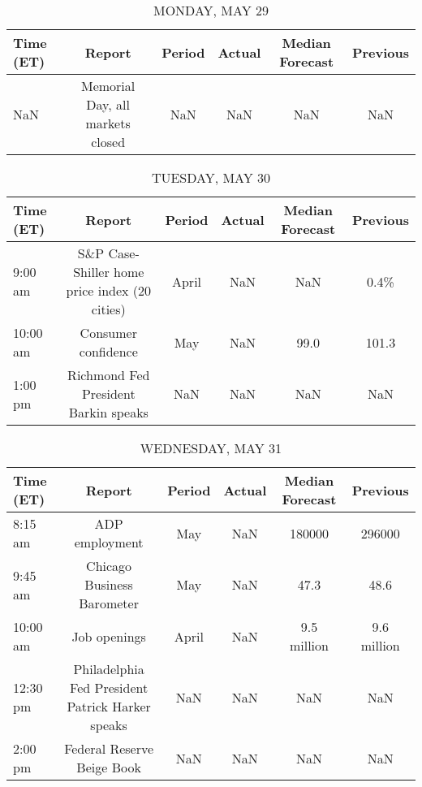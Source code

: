 \documentclass{article}%
\begin{document}
%
\normalsize%


\begin{table}[htbp]%
\caption{MONDAY, MAY 29}%
\centering%
\begin{adjustbox}{width=1\textwidth}%
\begin{tabular}{lccccc}
\toprule
Time (ET) &                           Report & Period & Actual & Median Forecast & Previous \\
\midrule
      NaN & Memorial Day, all markets closed &    NaN &    NaN &             NaN &      NaN \\
\bottomrule
\end{tabular}
%
\end{adjustbox}%
\end{table}

%


\begin{table}[htbp]%
\caption{TUESDAY, MAY 30}%
\centering%
\begin{adjustbox}{width=1\textwidth}%
\begin{tabular}{lccccc}
\toprule
Time (ET) &                                        Report & Period & Actual & Median Forecast & Previous \\
\midrule
  9:00 am & S\&P Case-Shiller home price index (20 cities) &  April &    NaN &             NaN &     0.4\% \\
 10:00 am &                           Consumer confidence &    May &    NaN &            99.0 &    101.3 \\
  1:00 pm &          Richmond Fed President Barkin speaks &    NaN &    NaN &             NaN &      NaN \\
\bottomrule
\end{tabular}
%
\end{adjustbox}%
\end{table}

%


\begin{table}[htbp]%
\caption{WEDNESDAY, MAY 31}%
\centering%
\begin{adjustbox}{width=1\textwidth}%
\begin{tabular}{lccccc}
\toprule
Time (ET) &                                           Report & Period & Actual & Median Forecast &    Previous \\
\midrule
  8:15 am &                                   ADP employment &    May &    NaN &          180000 &      296000 \\
  9:45 am &                       Chicago Business Barometer &    May &    NaN &            47.3 &        48.6 \\
 10:00 am &                                     Job openings &  April &    NaN &     9.5 million & 9.6 million \\
 12:30 pm & Philadelphia Fed President Patrick Harker speaks &    NaN &    NaN &             NaN &         NaN \\
  2:00 pm &                       Federal Reserve Beige Book &    NaN &    NaN &             NaN &         NaN \\
\bottomrule
\end{tabular}
%
\end{adjustbox}%
\end{table}
\end{document}
